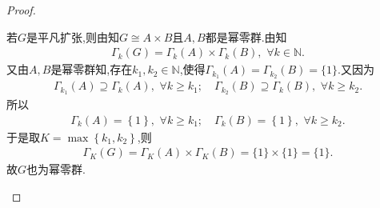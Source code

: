 \documentclass[../../main.tex]{subfiles}%
\begin{document}
\begin{proof}
\begin{enumerate}[(1)]
若$G$是平凡扩张,则由知$G \cong A \times B$且$A, B$都是幂零群.由知
\begin{align*}
\Gamma_k(G) = \Gamma_k(A) \times \Gamma_k(B),\,\,\forall k\in \mathbb{N}.
\end{align*}
又由$A, B$是幂零群知,存在$k_1,k_2\in \mathbb{N}$,使得$\Gamma_{k_1}(A)=\Gamma_{k_2}(B)=\{1\}$.又因为
\begin{align*}
\Gamma _{k_1}(A)\supseteq \Gamma _k(A),\,\,\forall k\geqslant k_1;\quad \Gamma _{k_2}(B)\supseteq \Gamma _k(B),\,\,\forall k\geqslant k_2.
\end{align*}
所以
\begin{align*}
\Gamma _k\left( A \right) =\left\{ 1 \right\} ,\,\,\forall k\geqslant k_1;\quad \Gamma _k\left( B \right) =\left\{ 1 \right\} ,\,\,\forall k\geqslant k_2.
\end{align*}
于是取$K=\max \left\{ k_1,k_2 \right\} $,则
\begin{align*}
\Gamma_K(G)=\Gamma_K(A)\times \Gamma_K(B)=\{1\}\times\{1\}=\{1\}.
\end{align*}
故$G$也为幂零群.
\end{enumerate}

\end{proof}
\end{document}
